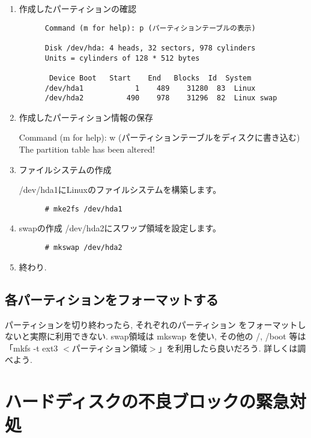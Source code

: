 \documentclass{jarticle}
\begin{document}
\begin{enumerate}
\item 作成したパーティションの確認

      \begin{verbatim}
      Command (m for help): p (パーティションテーブルの表示)

      Disk /dev/hda: 4 heads, 32 sectors, 978 cylinders
      Units = cylinders of 128 * 512 bytes

       Device Boot   Start    End   Blocks  Id  System
      /dev/hda1            1    489    31280  83  Linux
      /dev/hda2          490    978    31296  82  Linux swap
      \end{verbatim}

\item 作成したパーティション情報の保存

     Command (m for help): w (パーティションテーブルをディスクに書き込む)
     The partition table has been altered!

\item ファイルシステムの作成

      /dev/hda1にLinuxのファイルシステムを構築します。

      \begin{verbatim}
      # mke2fs /dev/hda1
      \end{verbatim}

\item swapの作成 /dev/hda2にスワップ領域を設定します。

      \begin{verbatim}
      # mkswap /dev/hda2
      \end{verbatim}

\item 終わり.
\end{enumerate}

\subsection{各パーティションをフォーマットする}

パーティションを切り終わったら, それぞれのパーティション
をフォーマットしないと実際に利用できない. swap領域は mkswap
を使い, その他の /, /boot 等は
「mkfs -t ext3 $<$パーティション領域$>$」を利用したら良いだろう.
詳しくは調べよう.

\section{ハードディスクの不良ブロックの緊急対処}
\end{document}
